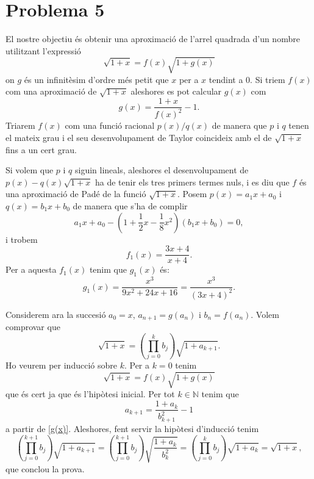 \documentclass[12pt]{article}
\newcommand{\N}{\mathbb{N}}
\begin{document}
\section*{Problema 5}
El nostre objectiu és obtenir una aproximació de l'arrel quadrada d'un nombre utilitzant l'expressió
\begin{equation*}
	\sqrt{1+x}=f(x)\sqrt{1+g(x)}
\end{equation*}
on $g$ és un infinitèsim d'ordre més petit que $x$ per a $x$ tendint a $0$. Si triem $f(x)$ com una aproximació de $\sqrt{1+x}$ aleshores es pot calcular $g(x)$ com
\begin{equation}\label{g(x)}
	g(x)=\dfrac{1+x}{f(x)^2}-1.
\end{equation}
Triarem $f(x)$ com una funció racional $p(x)/q(x)$ de manera que $p$ i $q$ tenen el mateix grau i el seu desenvolupament de Taylor coincideix amb el de $\sqrt{1+x}$ fins a un cert grau.

Si volem que $p$ i $q$ siguin lineals, aleshores el desenvolupament de $p(x)-q(x)\sqrt{1+x}$ ha de tenir els tres primers termes nuls, i es diu que $f$ és una aproximació de Padé de la funció $\sqrt{1+x}$. Posem $p(x)=a_1x+a_0$ i $q(x)=b_1x+b_0$ de manera que s'ha de complir
\begin{equation}\label{pade}
	a_1x+a_0-\left( 1+\frac{1}{2}x-\frac{1}{8}x^2\right) \left(b_1x+b_0\right)=0,
\end{equation}
i trobem
\begin{equation*}
	f_1(x)=\dfrac{3x+4}{x+4}.
\end{equation*}
Per a aquesta $f_1(x)$ tenim que $g_1(x)$ és:
\begin{equation} \label{eq:g1}
	g_1(x)=\dfrac{x^3}{9x^2+24x+16} = \frac{x^3}{(3x + 4)^2}. 
\end{equation}

Considerem ara la succesió $a_0=x$, $a_{n+1}=g(a_n)$ i $b_n=f(a_n)$. Volem comprovar que
\begin{equation}\label{volem demostrar}
	\sqrt{1+x}=\left(\prod_{j=0}^kb_j \right)\sqrt{1+a_{k+1}}.
\end{equation}
Ho veurem per inducció sobre $k$. Per a $k=0$ tenim
\begin{equation*}
	\sqrt{1+x}=f(x)\sqrt{1+g(x)}
\end{equation*}
que és cert ja que és l'hipòtesi inicial. Per tot \( k \in \N \) tenim que
\begin{equation}\label{blabla}
	a_{k+1}= \frac{1 + a_k}{b_{k+1}^2} - 1
\end{equation}
a partir de \ref{g(x)}. Aleshores, fent servir la hipòtesi d'inducció tenim  
\begin{equation*}
	\left(\prod_{j=0}^{k+1} b_j\right) \sqrt{1 + a_{k+1}} = \left(\prod_{j=0}^{k+1} b_j\right) \sqrt{\frac{1+a_k}{b_k^2}} = \left(\prod_{j=0}^{k} b_j\right) \sqrt{1 + a_k} = \sqrt{1+x},
\end{equation*}
que conclou la prova. 
\end{document}

